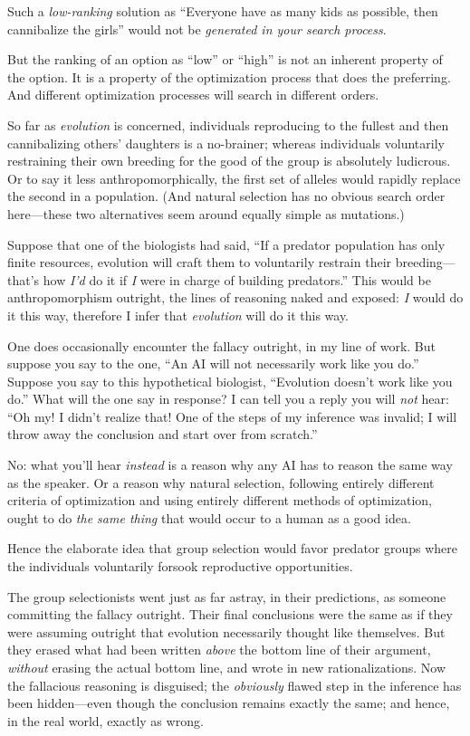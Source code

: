 {
 Such a \textit{low-ranking} solution as
``Everyone have as many kids as possible, then
cannibalize the girls'' would not be
\textit{generated in your search process}.}

{
 But the ranking of an option as
``low'' or
``high'' is not an inherent property
of the option. It is a property of the optimization process that does
the preferring. And different optimization processes will search in
different orders.}

{
 So far as \textit{evolution} is concerned, individuals reproducing
to the fullest and then cannibalizing others' daughters
is a no-brainer; whereas individuals voluntarily restraining their own
breeding for the good of the group is absolutely ludicrous. Or to say
it less anthropomorphically, the first set of alleles would rapidly
replace the second in a population. (And natural selection has no
obvious search order here---these two alternatives seem around equally
simple as mutations.)}

{
 Suppose that one of the biologists had said, ``If
a predator population has only finite resources, evolution will craft
them to voluntarily restrain their breeding---that's
how \textit{I'd} do it if \textit{I} were in charge of
building predators.'' This would be anthropomorphism
outright, the lines of reasoning naked and exposed: \textit{I} would do
it this way, therefore I infer that \textit{evolution} will do it this
way.}

{
 One does occasionally encounter the fallacy outright, in my line
of work. But suppose you say to the one, ``An AI will
not necessarily work like you do.'' Suppose you say
to this hypothetical biologist, ``Evolution
doesn't work like you do.'' What will
the one say in response? I can tell you a reply you will \textit{not}
hear: ``Oh my! I didn't realize that!
One of the steps of my inference was invalid; I will throw away the
conclusion and start over from scratch.''}

{
 No: what you'll hear \textit{instead} is a reason
why any AI has to reason the same way as the speaker. Or a reason why
natural selection, following entirely different criteria of
optimization and using entirely different methods of optimization,
ought to do \textit{the same thing} that would occur to a human as a
good idea.}

{
 Hence the elaborate idea that group selection would favor predator
groups where the individuals voluntarily forsook reproductive
opportunities.}

{
 The group selectionists went just as far astray, in their
predictions, as someone committing the fallacy outright. Their final
conclusions were the same as if they were assuming outright that
evolution necessarily thought like themselves. But they erased what had
been written \textit{above} the bottom line of their argument,
\textit{without} erasing the actual bottom line, and wrote in new
rationalizations. Now the fallacious reasoning is disguised; the
\textit{obviously} flawed step in the inference has been hidden---even
though the conclusion remains exactly the same; and hence, in the real
world, exactly as wrong.}

